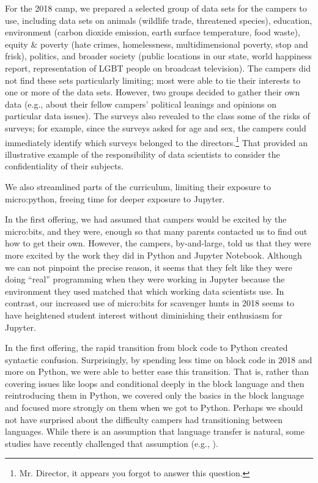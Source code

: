 For the 2018 camp, we prepared a selected group of data sets for
the campers to use, including data sets on animals (wildlife trade,
threatened species), education, environment (carbon dioxide emission,
earth surface temperature, food waste), equity \& poverty (hate crimes,
homelessness, multidimensional poverty, stop and frisk), politics,
and broader society (public locations in our state, world happiness
report, representation of LGBT people on broadcast television).
The campers did not find these sets particularly limiting; most
were able to tie their interests to one or more of the data sets.
However, two groups decided to gather their own data (e.g., about
their fellow campers' political leanings and opinions on particular
data issues).  The surveys also revealed to the class some of the
risks of surveys; for example, since the surveys asked for age and
sex, the campers could immediately identify which surveys belonged
to the directors.\footnote{Mr. Director, it appears you forgot to
answer this question.}  That provided an illustrative example of
the responsibility of data scientists to consider the confidentiality
of their subjects.

We also streamlined parts of the curriculum, limiting their exposure
to micro:python, freeing time for deeper exposure to Jupyter.

In the first offering, we had assumed that campers would be excited
by the micro:bits, and they were, enough so that many parents
contacted us to find out how to get their own.  However, the campers,
by-and-large, told us that they were more excited by the work they
did in Python and Jupyter Notebook.  Although we can not pinpoint
the precise reason, it seems that they felt like they were doing
``real'' programming when they were working in Jupyter because the
environment they used matched that which working data scientists
use.  In contrast, our increased use of micro:bits for scavenger
hunts in 2018 seems to have heightened student interest without
diminishing their enthusiasm for Jupyter.

In the first offering, the rapid transition from block code to Python created
syntactic confusion.  Surprisingly, by spending less time on block
code in 2018 and more on Python, we were able to better ease this
transition.  That is, rather than covering issues like loops and
conditional deeply in the block language and then reintroducing
them in Python, we covered only the basics in the block language
and focused more strongly on them when we got to Python.  Perhaps
we should not have surprised about the difficulty campers had
transitioning between languages.  While there is an assumption that
language transfer is natural, some studies have recently challenged
that assumption (e.g., \cite{Chetty2012,Dann2012}).

